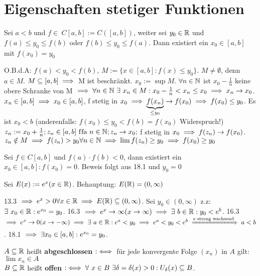 \documentclass[a4paper,oneside,DIV15,BCOR12mm]{scrbook}
\begin{document}
\chapter{Eigenschaften stetiger Funktionen}

\begin{satz}[Zwischenwertsatz]
Sei $a<b$ und $f \in\ C[a, b]:=C([a, b])$, weiter sei $y_0 \in\mathbb{R}$ und $f(a) \le y_0 \le f(b)$ oder $f(b) \le y_0 \le f(a)$. Dann existiert ein $x_0 \in [a, b]$ mit $f(x_0)=y_0$
\end{satz}

\begin{beweis}
O.B.d.A: $f(a)<y_0<f(b)$, $M:=\{x \in [a,b]: f(x)\le y_0\}$. $M \ne \emptyset $, denn $a \in M$. $M \subseteq [a, b] \implies$ M ist beschränkt. $x_0:=\sup M$. $\forall n \in \mathbb{N}$ ist $x_0 - \frac{1}{n}$ keine obere Schranke von M $\implies \forall n\in\mathbb{N}\ \exists\ x_n\in M: x_0 - \frac{1}{n}<x_n\le x_0 \implies x_n \to x_0$. $x_n \in [a, b] \implies x_0 \in [a, b]$, f stetig in $x_0 \implies \underbrace{f(x_n)}_{\le y_0} \to f(x_0) \implies f(x_0)\le y_0$. Es ist $x_0<b$ (anderenfalls: $f(x_0) \le y_0 < f(b)=f(x_0)$ Widerspruch!) $z_n:=x_0+\frac{1}{n}; z_n \in [a, b] \text{ f\/fa } n\in\mathbb{N}; z_n \to x_0;$ f stetig in $x_0 \implies f(z_n) \to f(x_0)$. $z_n \notin M \implies f(z_n)>y_0 \forall n \in\mathbb{N} \implies \lim f(z_n) \ge y_0 \implies f(x_0) \ge y_0$
\end{beweis}

\begin{satz}
Sei $f \in C[a, b]$ und $f(a) \cdot f(b)<0$, dann existiert ein $x_0 \in [a, b]: f(x_0)=0$. Beweis folgt aus 18.1 und $y_0=0$
\end{satz}

\begin{anwendung}
Sei $E(x):=e^x (x \in\mathbb{R})$. Behauptung: $E(\mathbb{R})=(0, \infty)$
\end{anwendung}

\begin{beweis}
13.3 $\implies e^x>0 \forall x \in \mathbb{R} \implies E(\mathbb{R}) \subseteq (0, \infty)$. Sei $y_0 \in (0, \infty)$ z.z: $\exists\ x_0 \in \mathbb{R} : e^{x_0}=y_0$. 16.3 $\implies e^x \to \infty (x\to \infty) \implies \exists\ b \in\mathbb{R} : y_0 < e^b$. 16.3 $\folgt e^x \to 0 (x \to -\infty) \folgt \exists\ a \in\MdR : e^a < y_0 \folgt e^a < y_0 < e^b \folgtnach{e streng wachsend} a<b$. 18.1 $\implies \exists x_0 \in [a, b]: e^{x_0}=y_0$.
\end{beweis}

\begin{definition}
$A \subseteq \mathbb{R}$ heißt \textbf{abgeschlossen} $:\iff$ für jede konvergente Folge $(x_n)$ in $A$ gilt: $\lim x_n \in A$\\
$B \subseteq \mathbb{R}$ heißt \textbf{offen} $:\iff \forall\ x \in B \ \exists \delta=\delta(x)>0 : U_\delta(x) \subseteq B$.
\end{definition}
\end{document}

